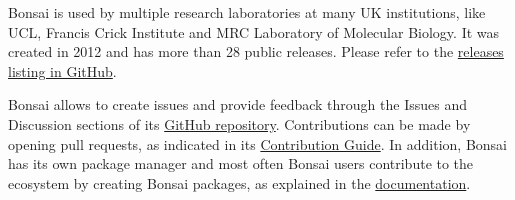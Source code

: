 Bonsai is used by multiple research laboratories at many UK institutions, like
UCL, Francis Crick Institute and MRC Laboratory of Molecular Biology.
%
It was created in 2012 and has more than 28 public releases.  Please refer to
the \href{https://github.com/bonsai-rx/bonsai/releases}{releases listing in
GitHub}.

Bonsai allows to create issues and provide feedback through the Issues and
Discussion sections of its \href{https://github.com/bonsai-rx/bonsai}{GitHub
repository}.
%
Contributions can be made by opening pull requests, as indicated in its
\href{https://bonsai-rx.org/contribute/}{Contribution Guide}. In addition,
Bonsai has its own package manager and most often Bonsai users contribute to
the ecosystem by creating Bonsai packages, as explained in the
\href{https://bonsai-rx.org/docs/articles/create-package.html}{documentation}.
